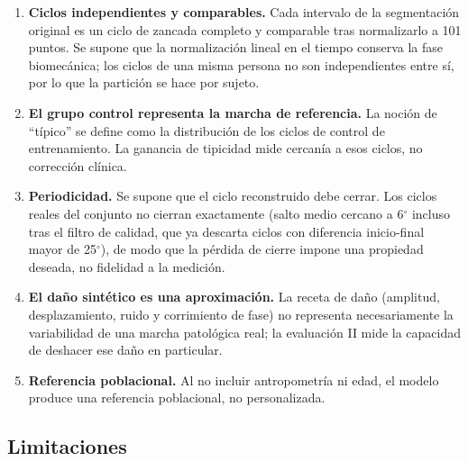 \documentclass[11pt,a4paper]{article}
\newcommand{\gr}{$^{\circ}$}
\begin{document}
\begin{enumerate}
\item \textbf{Ciclos independientes y comparables.} Cada intervalo de la segmentación original es un ciclo de zancada completo y comparable tras normalizarlo a 101 puntos. Se supone que la normalización lineal en el tiempo conserva la fase biomecánica; los ciclos de una misma persona no son independientes entre sí, por lo que la partición se hace por sujeto.
\item \textbf{El grupo control representa la marcha de referencia.} La noción de ``típico'' se define como la distribución de los ciclos de control de entrenamiento. La ganancia de tipicidad mide cercanía a esos ciclos, no corrección clínica.
\item \textbf{Periodicidad.} Se supone que el ciclo reconstruido debe cerrar. Los ciclos reales del conjunto no cierran exactamente (salto medio cercano a 6\gr{} incluso tras el filtro de calidad, que ya descarta ciclos con diferencia inicio-final mayor de 25\gr{}), de modo que la pérdida de cierre impone una propiedad deseada, no fidelidad a la medición.
\item \textbf{El daño sintético es una aproximación.} La receta de daño (amplitud, desplazamiento, ruido y corrimiento de fase) no representa necesariamente la variabilidad de una marcha patológica real; la evaluación II mide la capacidad de deshacer ese daño en particular.
\item \textbf{Referencia poblacional.} Al no incluir antropometría ni edad, el modelo produce una referencia poblacional, no personalizada.
\end{enumerate}

\subsection{Limitaciones}
\end{document}
